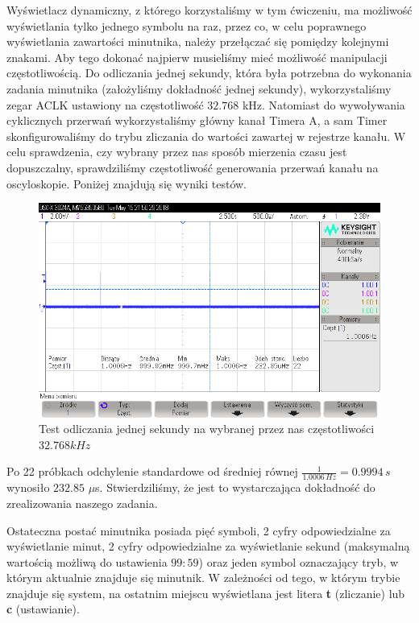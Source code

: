 \documentclass[fleqn]{article}
\begin{document}
Wyświetlacz dynamiczny, z którego korzystaliśmy w tym ćwiczeniu, ma możliwość wyświetlania tylko jednego symbolu na raz, przez co, w celu poprawnego wyświetlania zawartości minutnika, należy przełączać się pomiędzy kolejnymi znakami. Aby tego dokonać najpierw musieliśmy mieć możliwość manipulacji częstotliwością. Do odliczania jednej sekundy, która była potrzebna do wykonania zadania minutnika (założyliśmy dokładność jednej sekundy), wykorzystaliśmy zegar ACLK ustawiony na częstotliwość $32.768$ kHz. Natomiast do wywoływania cyklicznych przerwań wykorzystaliśmy główny kanał Timera A, a sam Timer skonfigurowaliśmy do trybu zliczania do wartości zawartej w rejestrze kanału. W celu sprawdzenia, czy wybrany przez nas sposób mierzenia czasu jest dopuszczalny, sprawdziliśmy częstotliwość generowania przerwań kanału na oscyloskopie. Poniżej znajdują się wyniki testów.

\begin{figure}[H]
	\includegraphics[width=\textwidth]{scope_1.png}
	\caption{Test odliczania jednej sekundy na wybranej przez nas częstotliwości $32.768 kHz$}
\end{figure}

Po 22 próbkach odchylenie standardowe od średniej równej $\frac{1}{1.0006\,Hz} = 0.9994\,s$ wynosiło $232.85$ $\mu$s. Stwierdziliśmy, że jest to wystarczająca dokładność do zrealizowania naszego zadania.

Ostateczna postać minutnika posiada pięć symboli, 2 cyfry odpowiedzialne za wyświetlanie minut, 2 cyfry odpowiedzialne za wyświetlanie sekund (maksymalną wartością możliwą do ustawienia $99:59$) oraz jeden symbol oznaczający tryb, w którym aktualnie znajduje się minutnik. W zależności od tego, w którym trybie znajduje się system, na ostatnim miejscu wyświetlana jest litera \textbf{t} (zliczanie) lub \textbf {c} (ustawianie).
\end{document}
